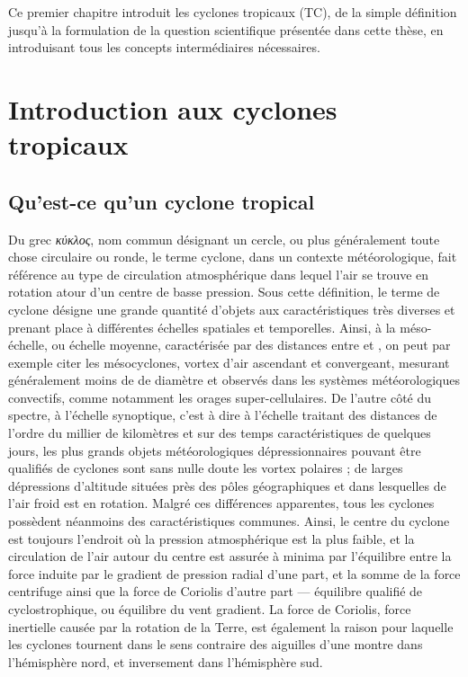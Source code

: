 \documentclass[../main.tex]{subfiles}
\begin{document}
\begin{itshape}
Ce premier chapitre introduit les cyclones tropicaux (TC), de la simple définition jusqu'à la formulation de la question scientifique présentée dans cette thèse, en introduisant tous les concepts intermédiaires nécessaires.
\end{itshape}

\minitoc\newpage
\section{Introduction aux cyclones tropicaux}

\subsection{Qu'est-ce qu'un cyclone tropical}\label{sec:quest_ce_qu_un_cyclone}

Du grec \textit{κύκλος}, nom commun désignant un cercle, ou plus généralement toute chose circulaire ou ronde, le terme cyclone, dans un contexte
météorologique, fait référence au type de circulation atmosphérique dans lequel l'air se trouve en rotation atour d'un centre de basse pression. Sous cette
définition, le terme de cyclone désigne une grande quantité d'objets aux caractéristiques très diverses et prenant place à différentes échelles spatiales et
temporelles. Ainsi, à la méso-échelle, ou échelle moyenne, caractérisée par des distances entre  et , on peut par exemple citer les mésocyclones,
vortex d'air ascendant et convergeant, mesurant généralement moins de  de diamètre et observés dans les systèmes météorologiques convectifs, comme
notamment les orages super-cellulaires. De l'autre côté du spectre, à l'échelle synoptique, c'est à dire à l'échelle traitant des distances de l'ordre du
millier de kilomètres et sur des temps caractéristiques de quelques jours, les plus grands objets météorologiques dépressionnaires pouvant être qualifiés de
cyclones sont sans nulle doute les vortex polaires ; de larges dépressions d'altitude situées près des pôles géographiques et dans lesquelles de l'air froid est
en rotation. Malgré ces différences apparentes, tous les cyclones possèdent néanmoins des caractéristiques communes. Ainsi, le centre du cyclone est toujours
l'endroit où la pression atmosphérique est la plus faible, et la circulation de l'air autour du centre est assurée à minima par l'équilibre entre la force
induite par le gradient de pression radial d'une part, et la somme de la force centrifuge ainsi que la force de Coriolis d'autre part --- équilibre qualifié de
cyclostrophique, ou équilibre du vent gradient. La force de Coriolis, force inertielle causée par la rotation de la Terre, est également la raison pour laquelle
les cyclones tournent dans le sens contraire des aiguilles d'une montre dans l'hémisphère nord, et inversement dans l'hémisphère sud.
\end{document}
